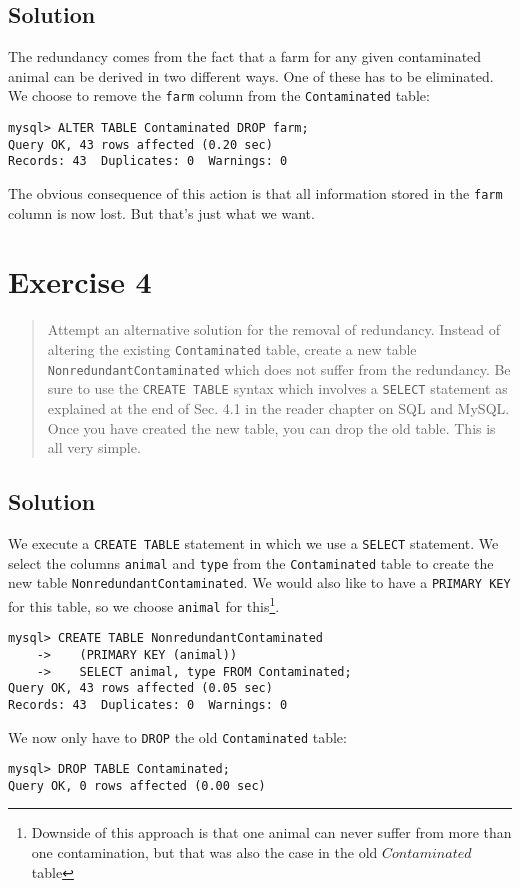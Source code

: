 \documentclass[11pt]{article}
\begin{document}
\subsection*{Solution}

The redundancy comes from the fact that a farm for any given contaminated animal can be derived in two different ways. One of these has to be eliminated. We choose to remove the \verb|farm| column from the \verb|Contaminated| table:

\begin{verbatim}
mysql> ALTER TABLE Contaminated DROP farm;
Query OK, 43 rows affected (0.20 sec)
Records: 43  Duplicates: 0  Warnings: 0
\end{verbatim}

The obvious consequence of this action is that all information stored in the \verb|farm| column is now lost. But that's just what we want.


\newpage

\section{Exercise 4}

\begin{quote}
Attempt an alternative solution for the removal of redundancy. Instead of altering the existing \verb|Contaminated| table, create a new table \verb|NonredundantContaminated| which does not suffer from the redundancy. Be sure to use the \verb|CREATE TABLE| syntax which involves a \verb|SELECT| statement as explained at the end of Sec. 4.1 in the reader chapter on SQL and MySQL. Once you have created the new table, you can drop the old table. This is all very simple.
\end{quote}

\subsection*{Solution}

We execute a \verb|CREATE TABLE| statement in which we use a \verb|SELECT| statement. We select the columns \verb|animal| and \verb|type| from the \verb|Contaminated| table to create the new table \verb|NonredundantContaminated|. We would also like to have a \verb|PRIMARY KEY| for this table, so we choose \verb|animal| for this\footnote{Downside of this approach is that one animal can never suffer from more than one contamination, but that was also the case in the old $Contaminated$ table}.

\begin{verbatim}
mysql> CREATE TABLE NonredundantContaminated
    ->    (PRIMARY KEY (animal))
    ->    SELECT animal, type FROM Contaminated;
Query OK, 43 rows affected (0.05 sec)
Records: 43  Duplicates: 0  Warnings: 0
\end{verbatim}

We now only have to \verb|DROP| the old \verb|Contaminated| table:

\begin{verbatim}
mysql> DROP TABLE Contaminated;
Query OK, 0 rows affected (0.00 sec)
\end{verbatim}
\end{document}

